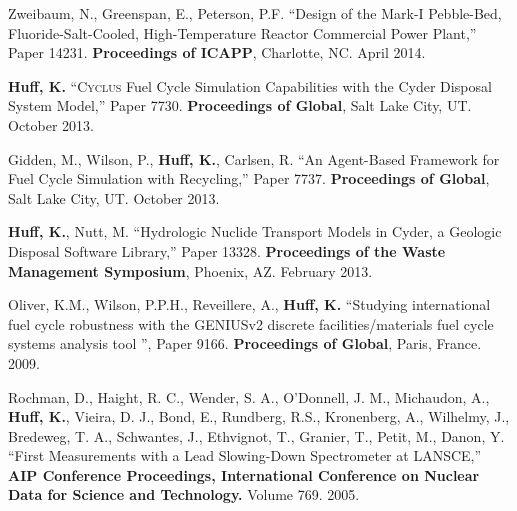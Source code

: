 \documentclass[margin,line]{resume}
\newcommand{\Cyclus}{\textsc{Cyclus}\xspace}%
\begin{document}
\begin{resume}
\begin{bibenum}
         Zweibaum, N., Greenspan, E., Peterson, P.F.  ``Design of the Mark-I
         Pebble-Bed, Fluoride-Salt-Cooled, High-Temperature Reactor Commercial Power
         Plant,'' Paper 14231.  \textbf{Proceedings of ICAPP}, Charlotte, NC. April 2014.
      \item \textbf{Huff, K.} ``\Cyclus Fuel Cycle Simulation Capabilities with the Cyder Disposal System Model,'' Paper 7730.
         \textbf{Proceedings of Global}, Salt Lake City, UT. October 2013.
      \item Gidden, M., Wilson, P., \textbf{Huff, K.}, Carlsen, R. ``An Agent-Based Framework for Fuel Cycle Simulation with Recycling,'' Paper 7737.
         \textbf{Proceedings of Global}, Salt Lake City, UT. October 2013.
      \item \textbf{Huff, K.}, Nutt, M. ``Hydrologic Nuclide Transport Models in Cyder, a Geologic Disposal Software Library,'' Paper 13328.
         \textbf{Proceedings of the Waste Management Symposium}, Phoenix, AZ.  February 2013.
      \item Oliver, K.M., Wilson, P.P.H., Reveillere, A., \textbf{Huff, K.} ``Studying international fuel cycle robustness with the GENIUSv2 discrete
          facilities/materials fuel cycle systems analysis tool	'', Paper 9166.
          \textbf{Proceedings of Global}, Paris, France. 2009.
      \item Rochman, D., Haight, R. C., Wender, S. A., O'Donnell, J. M.,
        Michaudon, A., \textbf{Huff, K.}, Vieira, D. J., Bond, E., Rundberg, R.S.,
        Kronenberg, A., Wilhelmy, J., Bredeweg, T. A., Schwantes, J., Ethvignot, T.,
        Granier, T., Petit, M., Danon, Y.
        ``First Measurements with a Lead Slowing-Down Spectrometer at LANSCE,''
        \textbf{AIP Conference Proceedings, International Conference on Nuclear
        Data for Science and Technology.} Volume 769. 2005.
    \end{bibenum}

\end{resume}
\end{document}
